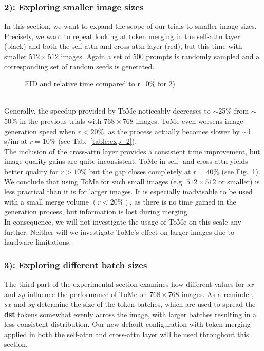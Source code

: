 \subsubsection*{2): Exploring smaller image sizes}
In this section, we want to expand the scope of our trials to smaller image sizes. Precisely, we want to repeat looking at token merging in the self-attn layer (black) and both the self-attn and cross-attn layer (red), but this time with smaller $512 \times 512$ images. Again a set of 500 prompts is randomly sampled and a corresponding set of random seeds is generated.
\begin{figure}[!htb]
    
    
\caption{FID and relative time compared to r=0\% for 2)}
\label{fig:exp_2}
\end{figure}\\
Generally, the speedup provided by ToMe noticeably decreases to $\sim$25\% from $\sim$50\% in the previous trials with \(768 \times 768\) images. ToMe even worsens image generation speed when \(r<20\%\), as the process actually becomes slower by $\sim$1 s/im at \(r=10\%\) (see Tab.~\ref{table:exp_2}).\\
The inclusion of the cross-attn layer provides a consistent time improvement, but image quality gains are quite inconsistent.
ToMe in self- and cross-attn yields better quality for \(r>10\%\) but the gap closes completely at \(r=40\%\) (see Fig.~\ref{fig:exp_2}).\\
We conclude that using ToMe for such small images (e.g. $512 \times 512$ or smaller) is less practical than it is for larger images. It is especially inadvisable to be used with a small merge volume \((r<20\%)\), as there is no time gained in the generation process, but information is lost during merging. \\
In consequence, we will not investigate the usage of ToMe on this scale any further. Neither will we investigate ToMe's effect on larger images due to hardware limitations.



\subsubsection*{3): Exploring different batch sizes}
The third part of the experimental section examines how different values for \(sx\) and \(sy\) influence the performance of ToMe on $768 \times 768$ images. As a reminder, \(sx\) and \(sy\) determine the size of the token batches, which are used to spread the \textbf{dst} tokens somewhat evenly across the image, with larger batches resulting in a less consistent distribution. Our new default configuration with token merging applied in both the self-attn and cross-attn layer will be used throughout this section.



